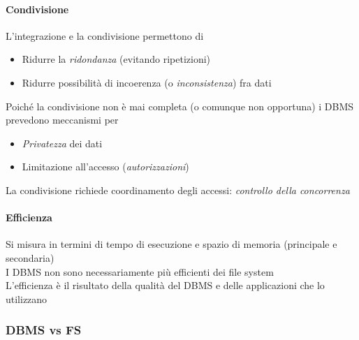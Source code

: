 \documentclass[12pt,a4paper]{article}
\begin{document}
\paragraph{Condivisione\\}
L’integrazione e la condivisione permettono di
\begin{itemize}
\item Ridurre la \textsl{ridondanza} (evitando ripetizioni)
\item Ridurre possibilità di incoerenza (o \textsl{inconsistenza}) fra dati
\end{itemize}
Poiché la condivisione non è mai completa (o comunque non opportuna) i DBMS prevedono meccanismi per
\begin{itemize}
\item \textsl{Privatezza} dei dati
\item Limitazione all'accesso (\textsl{autorizzazioni})
\end{itemize}
La condivisione richiede coordinamento degli accessi: \textsl{controllo della concorrenza}

\paragraph{Efficienza\\}
Si misura in termini di tempo di esecuzione e spazio di memoria (principale e secondaria)\\
I DBMS non sono necessariamente più efficienti dei file system\\
L’efficienza è il risultato della qualità del DBMS e delle applicazioni che lo utilizzano

\subsubsection{DBMS vs FS}
\begin{center}\end{center}
\end{document}
